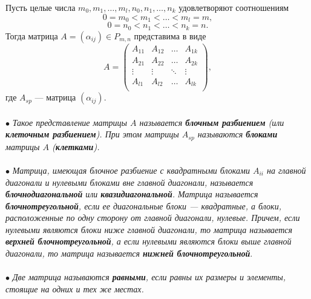 Пусть целые числа $m_0, m_1,\ldots, m_l, n_0, n_1,\ldots,n_k$ удовлетворяют соотношениям $$0 = m_0 < m_1 < \dots < m_l = m,$$ $$0 = n_0 < n_1 < \dots < n_k = n.$$ 
Тогда матрица $A = (\alpha_{ij}) \in P_{m,n}$ представима в виде $$A=  \begin{pmatrix}
	A_{11} & A_{12} & \dots & A_{1k}\\
	A_{21} & A_{22} & \dots & A_{2k}\\
	\vdots & \vdots & \ddots & \vdots\\
	A_{l1} & A_{l2} & \dots & A_{lk}\\
\end{pmatrix},$$ где $A_{sp}$ --- матрица $(\alpha_{ij})$.\\\\
$\bullet$ \textit{Такое представление матрицы $A$ называется \textbf{блочным разбиением} (или \textbf{клеточным разбиением}). При этом матрицы $A_{sp}$ называются \textbf{блоками} матрицы $A$ (\textbf{клетками}).}\\\\
$\bullet$ \textit{Матрица, имеющая блочное разбиение с квадратными блоками $A_{ii}$ на главной диагонали и нулевыми блоками вне главной диагонали, называется \textbf{блочнодиагональной} или \textbf{квазидиагональной}. Матрица называется \textbf{блочнотреугольной}, если ее диагональные блоки --- квадратные, а блоки, расположенные по одну сторону от главной диагонали, нулевые. Причем, если нулевыми являются блоки ниже главной диагонали, то матрица называется \textbf{верхней блочнотреугольной}, а если нулевыми являются блоки выше главной диагонали, то матрица называется \textbf{нижней блочнотреугольной}}.\\\\
$\bullet$ \textit{Две матрица называются \textbf{равными}, если равны их размеры и элементы, стоящие на одних и тех же местах.}

